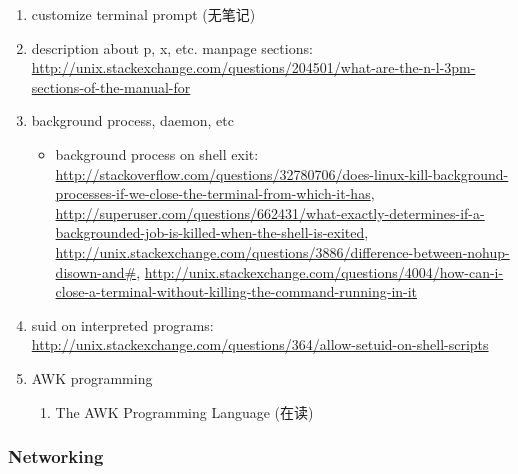 \documentclass{article}
\begin{document}
\begin{enumerate}
    \item customize terminal prompt (无笔记)
    \item description about p, x, etc. manpage sections: \url{http://unix.stackexchange.com/questions/204501/what-are-the-n-l-3pm-sections-of-the-manual-for}
    \item background process, daemon, etc
        \begin{itemize}
            \item background process on shell exit: \url{http://stackoverflow.com/questions/32780706/does-linux-kill-background-processes-if-we-close-the-terminal-from-which-it-has}, \url{http://superuser.com/questions/662431/what-exactly-determines-if-a-backgrounded-job-is-killed-when-the-shell-is-exited}, \url{http://unix.stackexchange.com/questions/3886/difference-between-nohup-disown-and#}, \url{http://unix.stackexchange.com/questions/4004/how-can-i-close-a-terminal-without-killing-the-command-running-in-it}
        \end{itemize}
    \item suid on interpreted programs: \url{http://unix.stackexchange.com/questions/364/allow-setuid-on-shell-scripts}
    \item AWK programming
        \begin{enumerate}
            \item The AWK Programming Language (在读)
        \end{enumerate}
\end{enumerate}
%
\subsubsection{Networking}
%
\begin{itemize}
\end{itemize}
%
\end{document}
